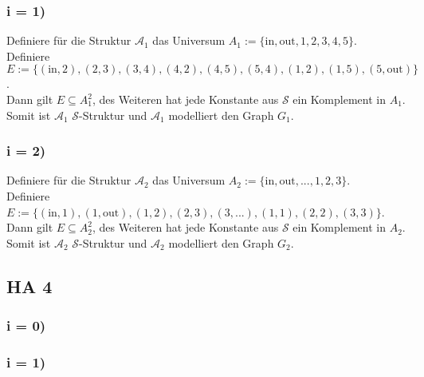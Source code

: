 \documentclass[12pt, a4paper]{article}
\begin{document}
\subsubsection*{i = 1)}
Definiere für die Struktur \(\mathcal A_1\) das Universum \(A_1 := \{\text{in}, \text{out}, 1, 2, 3, 4, 5\}\). \\
Definiere \(E := \{(\text{in}, 2), (2, 3), (3, 4), (4,2), (4,5), (5,4), (1,2), (1,5), (5, \text{out})\}\). \\
Dann gilt \(E \subseteq A_1^2\), des Weiteren hat jede Konstante aus \(\mathcal S\) ein Komplement in \(A_1\).\\
Somit ist \(\mathcal A_1\) \(\mathcal S\)-Struktur und \(\mathcal A_1\) modelliert den Graph \(G_1\).
\subsubsection*{i = 2)}
Definiere für die Struktur \(\mathcal A_2\) das Universum \(A_2 := \{\text{in}, \text{out}, \text{...}, 1, 2, 3\}\). \\
Definiere \(E := \{(\text{in}, 1), (1, \text{out}), (1, 2), (2,3), (3, \text{...}), (1,1), (2,2), (3,3)\}\). \\
Dann gilt \(E \subseteq A_2^2\), des Weiteren hat jede Konstante aus \(\mathcal S\) ein Komplement in \(A_2\).\\
Somit ist \(\mathcal A_2\) \(\mathcal S\)-Struktur und \(\mathcal A_2\) modelliert den Graph \(G_2\).
\subsection*{HA 4}
\subsubsection*{i = 0)}
\subsubsection*{i = 1)}
\end{document}
